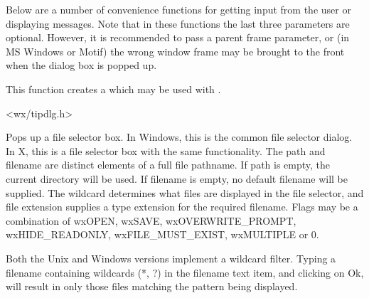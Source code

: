 Below are a number of convenience functions for getting input from the
user or displaying messages. Note that in these functions the last three
parameters are optional. However, it is recommended to pass a parent frame
parameter, or (in MS Windows or Motif) the wrong window frame may be brought to
the front when the dialog box is popped up.

\label{wxcreatefiletipprovider}


This function creates a  which may be
used with .





<wx/tipdlg.h>

\label{wxfileselector}


Pops up a file selector box. In Windows, this is the common file selector
dialog. In X, this is a file selector box with the same functionality.
The path and filename are distinct elements of a full file pathname.
If path is empty, the current directory will be used. If filename is empty,
no default filename will be supplied. The wildcard determines what files
are displayed in the file selector, and file extension supplies a type
extension for the required filename. Flags may be a combination of wxOPEN,
wxSAVE, wxOVERWRITE\_PROMPT, wxHIDE\_READONLY, wxFILE\_MUST\_EXIST, wxMULTIPLE or 0.

Both the Unix and Windows versions implement a wildcard filter. Typing a
filename containing wildcards (*, ?) in the filename text item, and
clicking on Ok, will result in only those files matching the pattern being
displayed.

